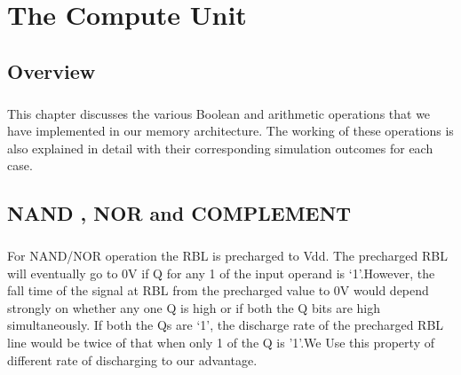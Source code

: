 
\let\textcircled=\pgftextcircled
\chapter{The Compute Unit}

\label{chap:compute_unit}

\section{Overview}
\paragraph{}

This chapter discusses the various Boolean and arithmetic operations that we have implemented in our memory architecture. The working of these operations is also explained in detail with their corresponding simulation outcomes for each case.

\section{NAND , NOR and COMPLEMENT}
\paragraph{}

For NAND/NOR operation the RBL is precharged to Vdd. The precharged RBL will eventually go to 0V if Q for any 1 of the input operand is ‘1’.However, the fall time of the signal at RBL from the precharged value to 0V would depend strongly on whether any one Q is high or if both the Q bits are high simultaneously. If both the Qs are ‘1’, the discharge rate of the precharged RBL line would be twice of that when only 1 of the Q is '1'.We Use this property of different rate of discharging to our advantage.

